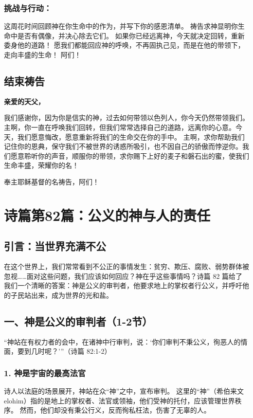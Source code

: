 \documentclass[a4paper, 12pt]{article}
\begin{document}
\subsubsection*{挑战与行动：}
这周花时间回顾神在你生命中的作为，并写下你的感恩清单。
祷告求神显明你生命中是否有偶像，并决心除去它们。
如果你已经远离神，今天就决定回转，重新委身他的道路！
愿我们都能回应神的呼唤，不再固执己见，而是在他的带领下，走向丰盛的生命！ 阿们！
\subsection*{结束祷告}
\textbf{亲爱的天父，}

我们感谢你，因为你是信实的神，过去如何带领以色列人，你今天仍然带领我们。主啊，你一直在呼唤我们回转，但我们常常选择自己的道路，远离你的心意。今天，我们愿意悔改，愿意重新将我们的生命交在你的手中。
主啊，求你帮助我们记住你的恩典，保守我们不被世界的诱惑所吸引，也不因自己的骄傲而悖逆你。我们愿意聆听你的声音，顺服你的带领，求你赐下上好的麦子和磐石出的蜜，使我们生命丰盛，荣耀你的名！

奉主耶稣基督的名祷告，阿们！
\newpage
\section{诗篇第82篇：公义的神与人的责任}
\subsection*{引言：当世界充满不公}
在这个世界上，我们常常看到不公正的事情发生：贫穷、欺压、腐败、弱势群体被忽视……面对这些问题，我们应该如何回应？神在乎这些事情吗？诗篇 82 篇给了我们一个清晰的答案：神是公义的审判者，他要求地上的掌权者行公义，并呼吁他的子民站出来，成为世界的光和盐。
\subsection*{一、神是公义的审判者（1-2节）}
“神站在有权力者的会中，在诸神中行审判，说：‘你们审判不秉公义，徇恶人的情面，要到几时呢？’”（诗篇 82:1-2）

\subsubsection*{1. 神是宇宙的最高法官}
诗人以法庭的场景展开，神站在众“神”之中，宣布审判。
这里的“神”（希伯来文 elohim）指的是地上的掌权者、法官或领袖，他们受神的托付，应该管理世界秩序。
然而，他们却没有秉公行义，反而徇私枉法，伤害了无辜的人。
\end{document}
